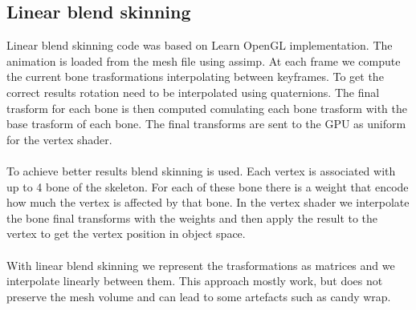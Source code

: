 \documentclass[12pt, a4paper]{article}
\begin{document}
\subsection{Linear blend skinning}
Linear blend skinning code was based on Learn OpenGL implementation. The animation is loaded from the mesh file using assimp.
At each frame we compute the current bone trasformations interpolating between keyframes. To get the correct results rotation
need to be interpolated using quaternions. The final trasform for each bone is then computed comulating each bone trasform with the base
trasform of each bone. The final transforms are sent to the GPU as uniform for the vertex shader.\\\\
To achieve better results blend skinning is used. Each vertex is associated with up to 4 bone
of the skeleton. For each of these bone there is a weight that encode how much the vertex is affected by that bone.
In the vertex shader we interpolate the bone final transforms with the weights and then apply the result to the vertex to get
the vertex position in object space.\\\\
With linear blend skinning we represent the trasformations as matrices and we interpolate linearly between them.
This approach mostly work, but does not preserve the mesh volume and can lead to some artefacts such as candy wrap.
\end{document}

